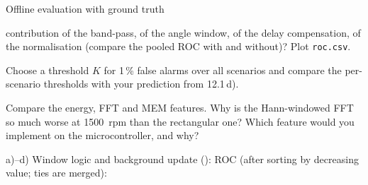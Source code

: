 \begin{exercise}{Offline evaluation with ground truth}{\JSLinux}
\begin{tasks}
    contribution of the band-pass, of the angle window, of the delay compensation, of
    the normalisation (compare the pooled ROC with and without)? Plot \texttt{roc.csv}.
  \item Choose a threshold $K$ for 1\,\% false alarms over all scenarios and compare the
    per-scenario thresholds with your prediction from 12.1\,d).
  \item Compare the energy, FFT and MEM features. Why is the Hann-windowed FFT so much
    worse at \SI{1500}{rpm} than the rectangular one? Which feature would you implement
    on the microcontroller, and why?
\end{tasks}
\end{exercise}

\begin{solution}
a)--d) Window logic and background update
():
ROC (after sorting by decreasing value; ties are merged):


\end{solution}

